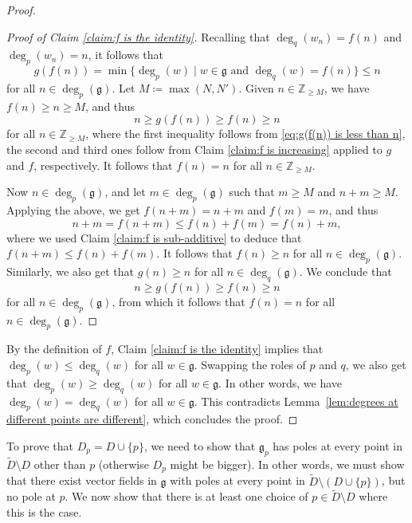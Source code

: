 \documentclass[12pt]{amsart}
\theoremstyle{plain}
\theoremstyle{definition}
\numberwithin{equation}{section}
\def\g{\mathfrak{g}}
\def\ZZ{\mathbb{Z}}
\begin{document}
\begin{proof}
\begin{proof}[Proof of Claim \ref{claim:f is the identity}]
        Recalling that $\deg_q(w_n) = f(n)$ and $\deg_p(w_n) = n$, it follows that
        \begin{equation}\label{eq:g(f(n)) is less than n}
            g(f(n)) = \min\{\deg_p(w) \mid w \in \g \text{ and } \deg_q(w) = f(n)\} \leq n
        \end{equation}
        for all $n \in \deg_p(\g)$. Let $M \coloneqq \max(N,N')$. Given $n \in \ZZ_{\geq M}$, we have $f(n) \geq n \geq M$, and thus
        $$n \geq g(f(n)) \geq f(n) \geq n$$
        for all $n \in \ZZ_{\geq M}$, where the first inequality follows from \eqref{eq:g(f(n)) is less than n}, the second and third ones follow from Claim \ref{claim:f is increasing} applied to $g$ and $f$, respectively. It follows that $f(n) = n$ for all $n \in \ZZ_{\geq M}$.

        Now $n \in \deg_p(\g)$, and let $m \in \deg_p(\g)$ such that $m \geq M$ and $n + m \geq M$. Applying the above, we get $f(n + m) = n + m$ and $f(m) = m$, and thus
        $$n + m = f(n + m) \leq f(n) + f(m) = f(n) + m,$$
        where we used Claim \ref{claim:f is sub-additive} to deduce that $f(n + m) \leq f(n) + f(m)$. It follows that $f(n) \geq n$ for all $n \in \deg_p(\g)$. Similarly, we also get that $g(n) \geq n$ for all $n \in \deg_q(\g)$. We conclude that
        $$n \geq g(f(n)) \geq f(n) \geq n$$
        for all $n \in \deg_p(\g)$, from which it follows that $f(n) = n$ for all $n \in \deg_p(\g)$.
    \end{proof}

    By the definition of $f$, Claim \ref{claim:f is the identity} implies that $\deg_p(w) \leq \deg_q(w)$ for all $w \in \g$. Swapping the roles of $p$ and $q$, we also get that $\deg_p(w) \geq \deg_q(w)$ for all $w \in \g$. In other words, we have $\deg_p(w) = \deg_q(w)$ for all $w \in \g$. This contradicts Lemma~\ref{lem:degrees at different points are different}, which concludes the proof.
\end{proof}

To prove that $D_p = D \cup \{p\}$, we need to show that $\g_p$ has poles at every point in $\widetilde{D} \setminus D$ other than $p$ (otherwise $D_p$ might be bigger). In other words, we must show that there exist vector fields in $\g$ with poles at every point in $\widetilde{D} \setminus (D \cup \{p\})$, but no pole at $p$. We now show that there is at least one choice of $p \in \widetilde{D} \setminus D$ where this is the case.
\end{document}
